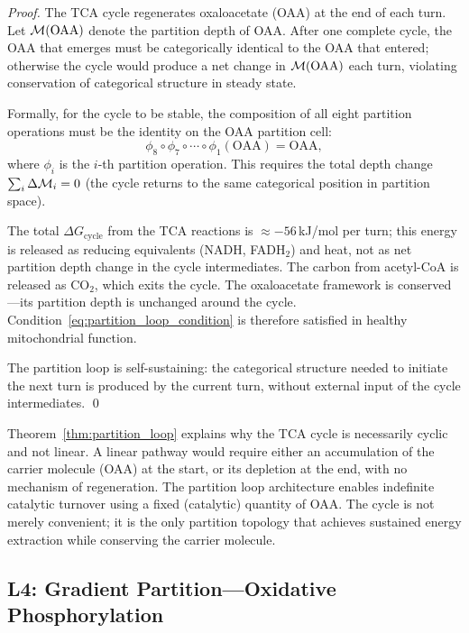 \begin{proof}
The TCA cycle regenerates oxaloacetate (OAA) at the end of each turn.
Let $\mathcal{M}(\mathrm{OAA})$ denote the partition depth of OAA. After one
complete cycle, the OAA that emerges must be categorically identical to
the OAA that entered; otherwise the cycle would produce a net change in
$\mathcal{M}(\mathrm{OAA})$ each turn, violating conservation of categorical
structure in steady state.

Formally, for the cycle to be stable, the composition of all eight
partition operations must be the identity on the OAA partition cell:
\begin{equation}
  \phi_8 \circ \phi_7 \circ \cdots \circ \phi_1 (\mathrm{OAA}) = \mathrm{OAA},
\end{equation}
where $\phi_i$ is the $i$-th partition operation. This requires the total
depth change $\sum_i \Delta\mathcal{M}_i = 0$ (the cycle returns to the same
categorical position in partition space).

The total $\Delta G_{\mathrm{cycle}}$ from the TCA reactions is $\approx -56$\,kJ/mol
per turn; this energy is released as reducing equivalents (NADH, FADH$_2$)
and heat, not as net partition depth change in the cycle intermediates.
The carbon from acetyl-CoA is released as CO$_2$, which exits the cycle.
The oxaloacetate framework is conserved---its partition depth is unchanged
around the cycle. Condition~\eqref{eq:partition_loop_condition} is
therefore satisfied in healthy mitochondrial function.

The partition loop is self-sustaining: the categorical structure needed
to initiate the next turn is produced by the current turn, without
external input of the cycle intermediates. \qed
\end{proof}

\begin{remark}
Theorem~\ref{thm:partition_loop} explains why the TCA cycle is necessarily
cyclic and not linear. A linear pathway would require either an accumulation
of the carrier molecule (OAA) at the start, or its depletion at the end,
with no mechanism of regeneration. The partition loop architecture enables
indefinite catalytic turnover using a fixed (catalytic) quantity of OAA.
The cycle is not merely convenient; it is the only partition topology that
achieves sustained energy extraction while conserving the carrier molecule.
\end{remark}

\subsection{L4: Gradient Partition---Oxidative Phosphorylation}
\label{ssec:L4}

